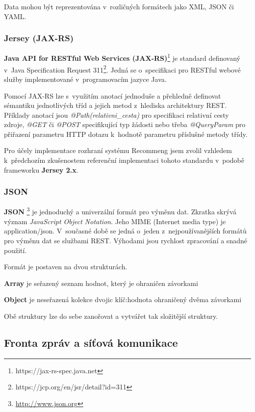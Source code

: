 \documentclass[thesis=M,czech]{FITthesis}[2014/05/07]
\begin{document}
Data mohou být reprezentována v~rozličných formátech jako XML, JSON či YAML.

\subsubsection{Jersey (JAX-RS)}
\textbf{Java API for RESTful Web Services (JAX-RS)}\footnote{https://jax-rs-spec.java.net} je standard definovaný v~Java Specification Request 311\footnote{https://jcp.org/en/jsr/detail?id=311}. Jedná se o~specifikaci pro RESTful webové služby implementované v~programovacím jazyce Java.

Pomocí JAX-RS lze s~využitím anotací jednoduše a přehledně definovat sémantiku jednotlivých tříd a jejich metod z~hlediska architektury REST. Příklady anotací jsou \emph{@Path(relativni\_cesta)} pro specifikaci relativní cesty zdroje, \emph{@GET} či \emph{@POST} specifikující typ žádosti nebo třeba \emph{@QueryParam} pro přiřazení parametru HTTP dotazu k~hodnotě parametru příslušné metody třídy.

Pro účely implementace rozhraní systému Recommeng jsem zvolil vzhledem k~předchozím zkušenostem referenční implementaci tohoto standardu v~podobě frameworku \textbf{Jersey 2.x}. 

\subsubsection{JSON}
\label{json}
\textbf{JSON }\footnote{\url{http://www.json.org}} je jednoduchý a univerzální formát pro výměnu dat. Zkratka skrývá význam \emph{JavaScript Object Notation}. Jeho MIME (Internet media type) je application/json. V~současné době se jedná o~jeden z~nejpoužívanějších formátů pro výměnu dat se službami REST. Výhodami jsou rychlost zpracování a snadné použití.

Formát je postaven na dvou strukturách. 

\begin{description}
	\item \textbf{Array} je seřazený seznam hodnot, který je ohraničen závorkami
	\item \textbf{Object} je neseřazená kolekce dvojic klíč:hodnota ohraničený dvěma závorkami
\end{description}

Obě struktury lze do sebe zanořovat a vytvářet tak složitější struktury.

\subsection{Fronta zpráv a síťová komunikace}
\end{document}
